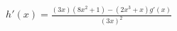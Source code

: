 \documentclass[preview]{standalone}
\begin{document}
\begin{align*}
h'(x) = \frac{(3x)(8x^2+1)-(2x^3+x)g'(x)}{(3x)^2}
\end{align*}
\end{document}
